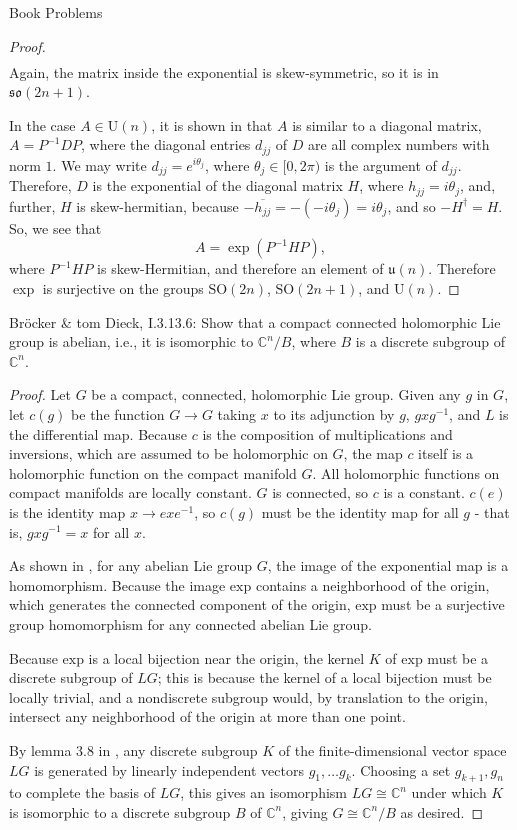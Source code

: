 \documentclass[12pt]{article}
\newcommand{\C}{\mathbb{C}}
\theoremstyle{definition}
\newenvironment{problem}[2][Problem]{\begin{trivlist}
\item[\hskip \labelsep {\bfseries #1}\hskip \labelsep {\bfseries #2.}]}{\end{trivlist}}
\begin{document}
\begin{section}{Book Problems}
\begin{proof}
\begin{align*}
  \end{align*}
  Again, the matrix inside the exponential is skew-symmetric, so it is in $\mathfrak{so}(2n + 1)$.
  \par In the case $A \in \text{U}(n)$, it is shown in \cite{lax} that $A$ is similar to a diagonal matrix, $A = P^{-1}DP$, where the diagonal entries $d_{jj}$ of $D$ are all complex numbers with norm $1$. We may write $d_{jj} = e^{i\theta_j}$, where $\theta_j \in [0, 2\pi)$ is the argument of $d_{jj}$. Therefore, $D$ is the exponential of the diagonal matrix $H$, where $h_{jj} = i\theta_j$, and, further, $H$ is skew-hermitian, because $-\overline{h_{jj}} = -(-i\theta_j) = i\theta_j$, and so $-H^\dagger = H$. So, we see that
  \[A = \exp \left( P^{-1}HP \right),\]
  where $P^{-1}HP$ is skew-Hermitian, and therefore an element of $\mathfrak{u}(n)$. Therefore $\exp$ is surjective on the groups $\text{SO}(2n)$, $\text{SO}(2n + 1)$, and $\text{U}(n)$.
\end{proof}
\begin{problem}{7}
	Br\"ocker \& tom Dieck, I.3.13.6: Show that a compact connected holomorphic Lie group is abelian, i.e., it is isomorphic to $\C^n/B$, where $B$ is a discrete subgroup of $\C^n$. 
\end{problem}
\begin{proof}
	Let $G$ be a compact, connected, holomorphic Lie group. Given any $g$ in $G$, let $c(g)$ be the function $G \to G$ taking $x$ to its adjunction by $g$, $gxg^{-1}$, and $L$ is the differential map. Because $c$ is the composition of multiplications and inversions, which are assumed to be holomorphic on $G$, the map $c$ itself is a holomorphic function on the compact manifold $G$. All holomorphic functions on compact manifolds are locally constant. $G$ is connected, so $c$ is a constant. $c(e)$ is the identity map $x \to exe^{-1}$, so $c(g)$ must be the identity map for all $g$ - that is, $gxg^{-1} = x$ for all $x$. 
	\par As shown in \cite{brock}, for any abelian Lie group $G$, the image of the exponential map is a homomorphism. Because the image $\text{exp}$ contains a neighborhood of the origin, which generates the connected component of the origin, $\text{exp}$ must be a surjective group homomorphism for any connected abelian Lie group.
	\par Because $\text{exp}$ is a local bijection near the origin, the kernel $K$ of $\text{exp}$ must be a discrete subgroup of $LG$; this is because the kernel of a local bijection must be locally trivial, and a nondiscrete subgroup would, by translation to the origin, intersect any neighborhood of the origin at more than one point.
	\par By lemma 3.8 in \cite{brock}, any discrete subgroup $K$ of the finite-dimensional vector space $LG$ is generated by linearly independent vectors $g_1, \dots g_k$. Choosing a set $g_{k+1}, g_{n}$ to complete the basis of $LG$, this gives an isomorphism $LG \cong \C^n$ under which $K$ is isomorphic to a discrete subgroup $B$ of $\C^n$, giving $G \cong \C^{n} / B$ as desired.
\end{proof}
\end{section}
\end{document}
